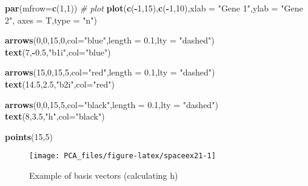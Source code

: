 \documentclass[
]{book}
\newenvironment{Shaded}{\begin{snugshade}}{\end{snugshade}}
\newcommand{\CommentTok}[1]{\textcolor[rgb]{0.56,0.35,0.01}{\textit{#1}}}
\newcommand{\DataTypeTok}[1]{\textcolor[rgb]{0.13,0.29,0.53}{#1}}
\newcommand{\DecValTok}[1]{\textcolor[rgb]{0.00,0.00,0.81}{#1}}
\newcommand{\FloatTok}[1]{\textcolor[rgb]{0.00,0.00,0.81}{#1}}
\newcommand{\KeywordTok}[1]{\textcolor[rgb]{0.13,0.29,0.53}{\textbf{#1}}}
\newcommand{\NormalTok}[1]{#1}
\newcommand{\OperatorTok}[1]{\textcolor[rgb]{0.81,0.36,0.00}{\textbf{#1}}}
\newcommand{\StringTok}[1]{\textcolor[rgb]{0.31,0.60,0.02}{#1}}
\theoremstyle{definition}
\theoremstyle{definition}
\theoremstyle{definition}
\theoremstyle{remark}
\begin{document}
\begin{Shaded}
\begin{Highlighting}[]
\KeywordTok{par}\NormalTok{(}\DataTypeTok{mfrow=}\KeywordTok{c}\NormalTok{(}\DecValTok{1}\NormalTok{,}\DecValTok{1}\NormalTok{))}
\CommentTok{# plot}
\KeywordTok{plot}\NormalTok{(}\KeywordTok{c}\NormalTok{(}\OperatorTok{-}\DecValTok{1}\NormalTok{,}\DecValTok{15}\NormalTok{),}\KeywordTok{c}\NormalTok{(}\OperatorTok{-}\DecValTok{1}\NormalTok{,}\DecValTok{10}\NormalTok{),}\DataTypeTok{xlab =} \StringTok{"Gene 1"}\NormalTok{,}\DataTypeTok{ylab =} \StringTok{"Gene 2"}\NormalTok{,}
 \DataTypeTok{axes =}\NormalTok{ T,}\DataTypeTok{type =} \StringTok{"n"}\NormalTok{)}

\KeywordTok{arrows}\NormalTok{(}\DecValTok{0}\NormalTok{,}\DecValTok{0}\NormalTok{,}\DecValTok{15}\NormalTok{,}\DecValTok{0}\NormalTok{,}\DataTypeTok{col=}\StringTok{"blue"}\NormalTok{,}\DataTypeTok{length =} \FloatTok{0.1}\NormalTok{,}\DataTypeTok{lty =} \StringTok{"dashed"}\NormalTok{)}
\KeywordTok{text}\NormalTok{(}\DecValTok{7}\NormalTok{,}\OperatorTok{-}\FloatTok{0.5}\NormalTok{,}\StringTok{"b1i"}\NormalTok{,}\DataTypeTok{col=}\StringTok{"blue"}\NormalTok{)}

\KeywordTok{arrows}\NormalTok{(}\DecValTok{15}\NormalTok{,}\DecValTok{0}\NormalTok{,}\DecValTok{15}\NormalTok{,}\DecValTok{5}\NormalTok{,}\DataTypeTok{col=}\StringTok{"red"}\NormalTok{,}\DataTypeTok{length =} \FloatTok{0.1}\NormalTok{,}\DataTypeTok{lty =} \StringTok{"dashed"}\NormalTok{)}
\KeywordTok{text}\NormalTok{(}\FloatTok{14.5}\NormalTok{,}\FloatTok{2.5}\NormalTok{,}\StringTok{"b2i"}\NormalTok{,}\DataTypeTok{col=}\StringTok{"red"}\NormalTok{)}

\KeywordTok{arrows}\NormalTok{(}\DecValTok{0}\NormalTok{,}\DecValTok{0}\NormalTok{,}\DecValTok{15}\NormalTok{,}\DecValTok{5}\NormalTok{,}\DataTypeTok{col=}\StringTok{"black"}\NormalTok{,}\DataTypeTok{length =} \FloatTok{0.1}\NormalTok{,}\DataTypeTok{lty =} \StringTok{"dashed"}\NormalTok{)}
\KeywordTok{text}\NormalTok{(}\DecValTok{8}\NormalTok{,}\FloatTok{3.5}\NormalTok{,}\StringTok{"h"}\NormalTok{,}\DataTypeTok{col=}\StringTok{"black"}\NormalTok{)}

\KeywordTok{points}\NormalTok{(}\DecValTok{15}\NormalTok{,}\DecValTok{5}\NormalTok{)}
\end{Highlighting}
\end{Shaded}

\begin{figure}

{\centering \texttt{[image: PCA\_files/figure-latex/spaceex21-1]} 

}

\caption{Example of basis vectors (calculating h)}\label{fig:spaceex21}
\end{figure}
\end{document}
